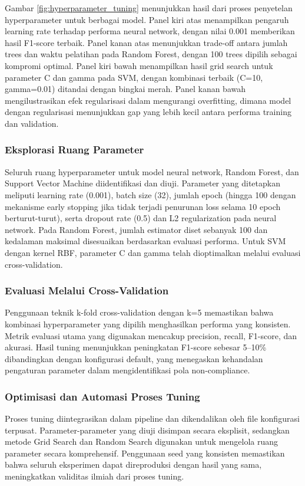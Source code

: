Gambar \ref{fig:hyperparameter_tuning} menunjukkan hasil dari proses penyetelan hyperparameter untuk berbagai model. Panel kiri atas menampilkan pengaruh learning rate terhadap performa neural network, dengan nilai 0.001 memberikan hasil F1-score terbaik. Panel kanan atas menunjukkan trade-off antara jumlah trees dan waktu pelatihan pada Random Forest, dengan 100 trees dipilih sebagai kompromi optimal. Panel kiri bawah menampilkan hasil grid search untuk parameter C dan gamma pada SVM, dengan kombinasi terbaik (C=10, gamma=0.01) ditandai dengan bingkai merah. Panel kanan bawah mengilustrasikan efek regularisasi dalam mengurangi overfitting, dimana model dengan regularisasi menunjukkan gap yang lebih kecil antara performa training dan validation.

\subsubsection{Eksplorasi Ruang Parameter}
Seluruh ruang hyperparameter untuk model neural network, Random Forest, dan Support Vector Machine diidentifikasi dan diuji. Parameter yang ditetapkan meliputi learning rate (0.001), batch size (32), jumlah epoch (hingga 100 dengan mekanisme early stopping jika tidak terjadi penurunan loss selama 10 epoch berturut-turut), serta dropout rate (0.5) dan L2 regularization pada neural network. Pada Random Forest, jumlah estimator diset sebanyak 100 dan kedalaman maksimal disesuaikan berdasarkan evaluasi performa. Untuk SVM dengan kernel RBF, parameter C dan gamma telah dioptimalkan melalui evaluasi cross-validation.

\subsubsection{Evaluasi Melalui Cross-Validation}
Penggunaan teknik k-fold cross-validation dengan k=5 memastikan bahwa kombinasi hyperparameter yang dipilih menghasilkan performa yang konsisten. Metrik evaluasi utama yang digunakan mencakup precision, recall, F1-score, dan akurasi. Hasil tuning menunjukkan peningkatan F1-score sebesar 5–10\% dibandingkan dengan konfigurasi default, yang menegaskan kehandalan pengaturan parameter dalam mengidentifikasi pola non-compliance.

\subsubsection{Optimisasi dan Automasi Proses Tuning}
Proses tuning diintegrasikan dalam pipeline dan dikendalikan oleh file konfigurasi terpusat. Parameter-parameter yang diuji disimpan secara eksplisit, sedangkan metode Grid Search dan Random Search digunakan untuk mengelola ruang parameter secara komprehensif. Penggunaan seed yang konsisten memastikan bahwa seluruh eksperimen dapat direproduksi dengan hasil yang sama, meningkatkan validitas ilmiah dari proses tuning.

